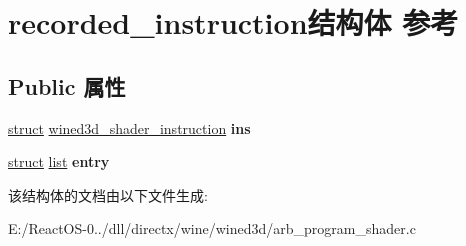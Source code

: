 \hypertarget{structrecorded__instruction}{}\section{recorded\+\_\+instruction结构体 参考}
\label{structrecorded__instruction}
\subsection*{Public 属性}
\begin{DoxyCompactItemize}
\item 
\mbox{\label{structrecorded__instruction_ad405a87e7ee583b98ac7651742a39442}} 
\hyperlink{interfacestruct}{struct} \hyperlink{structwined3d__shader__instruction}{wined3d\+\_\+shader\+\_\+instruction} {\bfseries ins}
\item 
\mbox{\label{structrecorded__instruction_afe386830a2ad10ac286a7c79cc55d118}} 
\hyperlink{interfacestruct}{struct} \hyperlink{classlist}{list} {\bfseries entry}
\end{DoxyCompactItemize}


该结构体的文档由以下文件生成\+:\begin{DoxyCompactItemize}
\item 
E\+:/\+React\+O\+S-\/0../dll/directx/wine/wined3d/arb\+\_\+program\+\_\+shader.\+c\end{DoxyCompactItemize}
